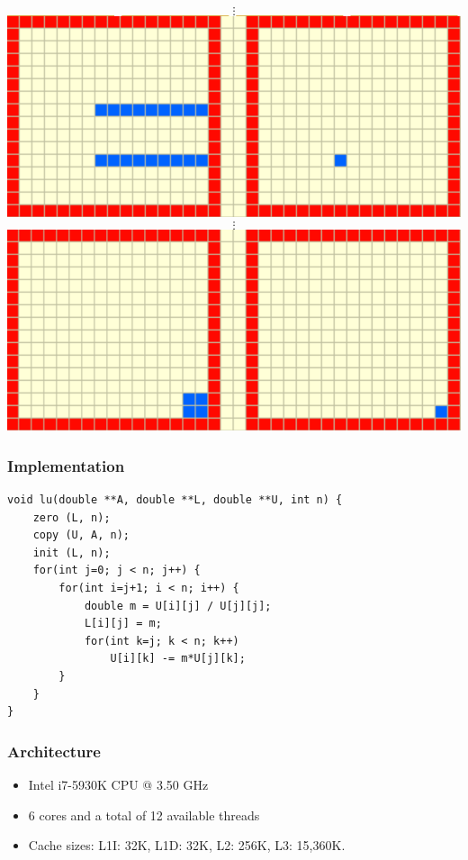 \documentclass{beamer}
\begin{document}
\begin{frame}
\begin{center}
$$\vdots$$
\includegraphics[scale=0.2]{figures/lu6}
$$\vdots$$
\includegraphics[scale=0.2]{figures/lu7}
\end{center}

\end{frame}


\begin{frame}[fragile]
\frametitle{Implementation}

\begin{lstlisting}
void lu(double **A, double **L, double **U, int n) {
    zero (L, n);
    copy (U, A, n);
    init (L, n);
    for(int j=0; j < n; j++) {
        for(int i=j+1; i < n; i++) {
            double m = U[i][j] / U[j][j];
            L[i][j] = m;
            for(int k=j; k < n; k++)
                U[i][k] -= m*U[j][k];
        }
    }
}
\end{lstlisting}

\end{frame}


\begin{frame}
\frametitle{Architecture}
\begin{itemize}

\item Intel i7-5930K CPU @ 3.50 GHz
\item 6 cores and a total of 12 available threads
\item Cache sizes: L1I: 32K, L1D: 32K, L2: 256K, L3: 15,360K.


\end{itemize}
\end{frame}
\end{document}

